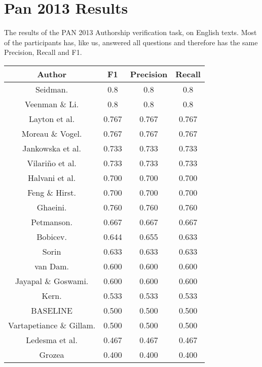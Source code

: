 \section{Pan 2013 Results} \label{sec:appendix:pan_2013_results}
The results of the PAN 2013 Authorship verification task, on English texts. Most
of the participants has, like us, answered all questions and therefore has the
same Precision, Recall and F1.

\begin{center}
\begin{tabular}{|c|c|c|c|}
\hline
\textbf{Author}          & \textbf{F1} & \textbf{Precision} & \textbf{Recall} \\ \hline
Seidman.                 & 0.8         & 0.8                & 0.8             \\ \hline
Veenman \& Li.           & 0.8         & 0.8                & 0.8             \\ \hline
Layton et al.            & 0.767       & 0.767              & 0.767           \\ \hline
Moreau \& Vogel.         & 0.767       & 0.767              & 0.767           \\ \hline
Jankowska et al.         & 0.733       & 0.733              & 0.733           \\ \hline
Vilariño et al.          & 0.733       & 0.733              & 0.733           \\ \hline
Halvani et al.           & 0.700       & 0.700              & 0.700           \\ \hline
Feng \& Hirst.           & 0.700       & 0.700              & 0.700           \\ \hline
Ghaeini.                 & 0.760       & 0.760              & 0.760           \\ \hline
Petmanson.               & 0.667       & 0.667              & 0.667           \\ \hline
Bobicev.                 & 0.644       & 0.655              & 0.633           \\ \hline
Sorin                    & 0.633       & 0.633              & 0.633           \\ \hline
van Dam.                 & 0.600       & 0.600              & 0.600           \\ \hline
Jayapal \& Goswami.      & 0.600       & 0.600              & 0.600           \\ \hline
Kern.                    & 0.533       & 0.533              & 0.533           \\ \hline
BASELINE                 & 0.500       & 0.500              & 0.500           \\ \hline
Vartapetiance \& Gillam. & 0.500       & 0.500              & 0.500           \\ \hline
Ledesma et al.           & 0.467       & 0.467              & 0.467           \\ \hline
Grozea                   & 0.400       & 0.400              & 0.400           \\ \hline
\end{tabular}
\end{center}


